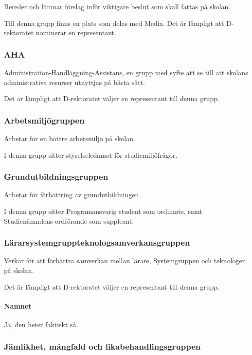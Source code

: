 \documentclass[a4paper,12pt]{article}
\begin{document}
Bereder och lämnar förslag inför viktigare beslut som skall fattas på skolan.

Till denna grupp finns en plats som delas med Media. Det är lämpligt att D-rektoratet nominerar en representant.

\subsubsection{AHA}

Administration-Handläggning-Assistans, en grupp med syfte att se till att skolans administrativa resurser utnyttjas på bästa sätt.

Det är lämpligt att D-rektoratet väljer en representant till denna grupp.

\subsubsection{Arbetsmiljögruppen}

Arbetar för en bättre arbetsmiljö på skolan.

I denna grupp sitter styrelseledamot för studiemiljöfrågor.

\subsubsection{Grundutbildningsgruppen}

Arbetar för förbättring av grundutbildningen.

I denna grupp sitter Programansvarig student som ordinarie, samt Studienämndens ordförande som suppleant.

\subsubsection{Lärarsystemgruppteknologsamverkansgruppen}

Verkar för att förbättra samverkan mellan lärare, Systemgruppen och teknologer på skolan.

Det är lämpligt att D-rektoratet väljer en representant till denna grupp.

\paragraph{Namnet}

Ja, den heter faktiskt så.

\subsubsection{Jämlikhet, mångfald och likabehandlingsgruppen}
\end{document}
